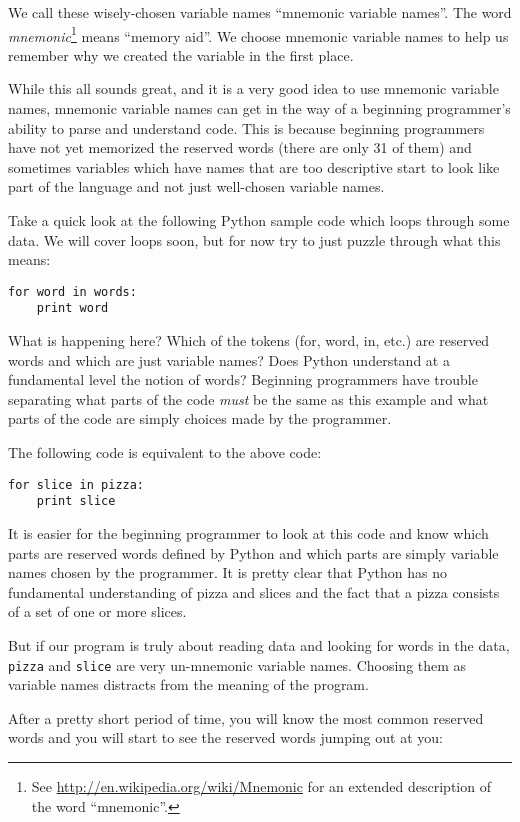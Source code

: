 \begin{ex}
We call these wisely-chosen variable names ``mnemonic variable names''.  The
word \emph{mnemonic}\footnote{See 
\url{http://en.wikipedia.org/wiki/Mnemonic}
for an extended description of the word ``mnemonic''.} 
means ``memory aid''.
We choose mnemonic variable names to help us remember why we created the variable
in the first place.

While this all sounds great, and it is a very good idea to use mnemonic variable
names, mnemonic variable names can get in the way of a beginning programmer's 
ability to parse and understand code.  This is because beginning programmers 
have not yet memorized the reserved words (there are only 31 of them) and sometimes
variables which have names that are too descriptive start to look like 
part of the language and not just well-chosen variable names.

Take a quick look at the following Python sample code which loops through some data. 
We will cover loops soon, but for now try to just puzzle through what this means:

\beforeverb
\begin{verbatim}
for word in words:
    print word
\end{verbatim}
\afterverb
%
What is happening here?  Which of the tokens (for, word, in, etc.) are reserved words
and which are just variable names?  Does Python understand at a fundamental level 
the notion of words?  Beginning programmers have 
trouble separating what parts of the
code \emph{must} be the same as this example and what parts of the code are simply
choices made by the programmer.

The following code is equivalent to the above code:

\beforeverb
\begin{verbatim}
for slice in pizza:
    print slice
\end{verbatim}
\afterverb
%
It is easier for the beginning programmer to look at this code and know which 
parts are reserved words defined by Python and which parts are simply variable
names chosen by the programmer.  It is pretty clear that Python has no fundamental
understanding of pizza and slices and the fact that a pizza consists of a set
of one or more slices.

But if our program is truly about reading data and looking for words in the data,
{\tt pizza} and {\tt slice} are very un-mnemonic variable names.  Choosing them 
as variable names distracts from the meaning of the program.

After a pretty short period of time, you will know the most common reserved words
and you will start to see the reserved words jumping out at you:


\end{ex}
